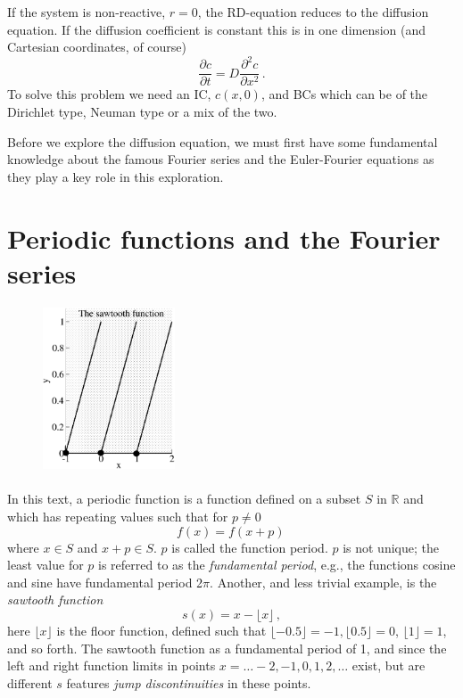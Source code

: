 
If the system is non-reactive, $r=0$, the RD-equation reduces to the diffusion equation. If the 
diffusion coefficient is constant this is in one dimension (and Cartesian
coordinates, of course)
\begin{equation}
	\frac{\partial c}{\partial t} = D \frac{\partial^2 c}{\partial x^2} \, .
\end{equation}
To solve this problem we need an IC, $c(x,0)$, and BCs which can be of the Dirichlet type, Neuman type
or a mix of the two. 

Before we explore the diffusion equation, we must first have some fundamental knowledge about   
the famous Fourier series and the Euler-Fourier equations as they play a key role in 
this exploration. 

\section{\label{sect:fourier}Periodic functions and the Fourier series}

\begin{figure}
	\centering
	\includegraphics[width=0.35\textwidth]{figs/sawtooth.eps}
\end{figure}
\paragraph{}
\vspace*{-\parskip}

In this text, a periodic function is a function defined on a subset $S$ in $\mathbb{R}$
and which has repeating values such that for $p \neq 0$ 
\begin{equation}
	f(x)=f(x+p)  \, 
\end{equation}
where $x \in S$ and $x + p \in S$. $p$ is called the function period. 
$p$ is not unique; the least value for $p$ is referred to as 
the \emph{fundamental period}, e.g., the functions cosine and sine 
have fundamental period 2$\pi$. Another, and less trivial example, is the \emph{sawtooth
function}
\begin{equation}
 s(x) = x - \lfloor x \rfloor \, ,
\end{equation}
here  $\lfloor x \rfloor$ is the floor function, defined such that $\lfloor -0.5 \rfloor = -1,
\lfloor 0.5 \rfloor = 0$, $\lfloor 1 \rfloor = 1$, and so forth. 
The sawtooth function as a fundamental period of 1, and since the left and right function
limits in points $x=\ldots -2,-1,0,1,2, \ldots$ exist, but are different $s$ features
\emph{jump discontinuities} in these points. 

